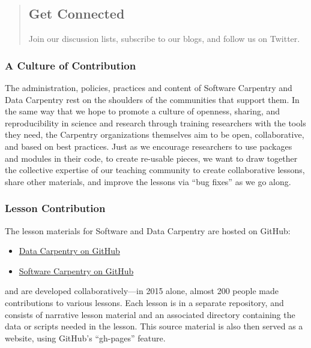 \begin{quotation}   %
\subsection*{Get Connected}

Join our discussion lists, subscribe to our blogs, and follow us on Twitter.
\end{quotation}   %

\subsubsection*{A Culture of Contribution}

The administration, policies, practices and content of
Software Carpentry and Data Carpentry rest on the shoulders of the
communities that support them.  In the same way that we hope to promote a
culture of openness, sharing,
and reproducibility in science and research through training researchers with
the tools they need, the
Carpentry organizations themselves aim to be open, collaborative, and
based on best practices.  Just
as we encourage researchers to use packages and modules in their code, to
create re-usable pieces, we want to draw together the collective expertise of
our teaching community to create collaborative lessons, share other materials,
and improve the lessons via ``bug fixes'' as we go along.

\subsubsection*{Lesson Contribution}

The lesson materials for Software and Data Carpentry
are hosted on GitHub:

\begin{itemize}
\item \href{\{\{ site.dc\_github \}\}}{Data Carpentry on GitHub}
\item \href{\{\{ site.swc\_github \}\}}{Software Carpentry on GitHub}
\end{itemize}

and are developed collaboratively---in 2015 alone, almost 200 people
made contributions to various lessons.  Each lesson is in a separate
repository, and consists of narrative lesson material and an
associated directory containing the data or scripts needed in the
lesson.  This source material is also then served as a website, using
GitHub's ``gh-pages'' feature.

